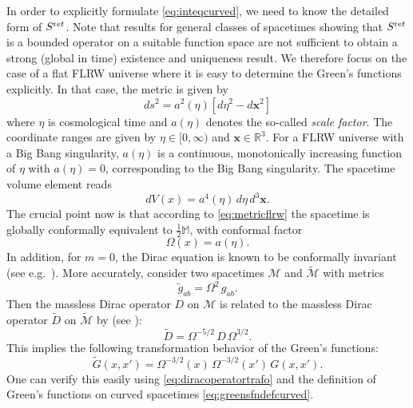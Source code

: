 \documentclass[b5paper,draft,openbib,12pt]{memoir}
\newcommand{\R}{\mathbb{R}}
\newcommand{\M}{\mathbb{M}}
\newcommand{\vx}{\mathbf{x}}
\newcommand{\ret}{{\textup ret}}
\begin{document}
In order to explicitly formulate \eqref{eq:inteqcurved}, we need 
to know the detailed form of $S^\ret$. Note that results for 
general classes of spacetimes showing that $S^\ret$ is a bounded 
operator on a suitable function space are not sufficient to obtain 
a strong (global in time) existence and uniqueness result. We 
therefore focus on the case of a flat FLRW universe where it is 
easy to determine the Green's functions explicitly. In that case, 
the metric is given by
\begin{equation}
	ds^2 = a^2(\eta) [d \eta^2 - d \vx^2]
	\label{eq:metricflrw}
\end{equation}
where $\eta$ is cosmological time and $a(\eta)$ denotes the 
so-called \textit{scale factor}. The coordinate ranges are given 
by $\eta \in [0,\infty)$ and $\vx \in \R^3$. For a FLRW universe 
with a Big Bang singularity, $a(\eta)$ is a continuous, 
monotonically increasing function of $\eta$ with $a(\eta)=0$, 
corresponding to the Big Bang singularity. The spacetime volume 
element reads
\begin{equation}
	dV(x) = a^4(\eta) \, d \eta\, d^3 \vx.
\end{equation}
The crucial point now is that according to \eqref{eq:metricflrw} 
the spacetime is globally conformally equivalent to $\frac{1}{2}\M$, 
with conformal factor
\begin{equation}
	\Omega(x) = a(\eta).
\end{equation}
In addition, for $m=0$, the Dirac equation is known to be 
conformally invariant (see e.g.\ \cite{penrose_rindler}). More 
accurately, consider two spacetimes $\mathcal{M}$ and 
$\widetilde{\mathcal{M}}$ with metrics
\begin{equation}
	\widetilde{g}_{ab} = \Omega^2 \, g_{ab}.
\end{equation}
Then the massless Dirac operator $D$ on $\mathcal{M}$ is related to 
the massless Dirac operator $\widetilde{D}$ on 
$\widetilde{\mathcal{M}}$ by (see \cite{haantjes}):
\begin{equation}
	\widetilde{D} = \Omega^{-5/2} \, D \, \Omega^{3/2}.
	\label{eq:diracoperatortrafo}
\end{equation}
This implies the following transformation behavior of the Green's 
functions:
\begin{equation}
	\widetilde{G}(x,x') = \Omega^{-3/2}(x) \,\Omega^{-3/2}(x') \, G(x,x').
\end{equation}
One can verify this easily using \eqref{eq:diracoperatortrafo} and 
the definition of Green's functions on curved spacetimes 
\eqref{eq:greensfndefcurved}.
\end{document}
